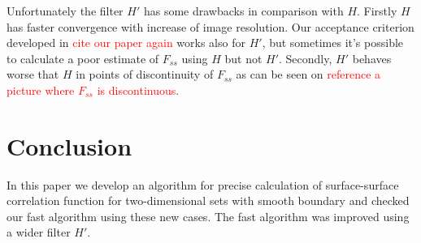 \documentclass[reprint,amsmath,amssymb,aps,pre,showkeys,showpacs]{revtex4-1}
\begin{document}
Unfortunately the filter $H'$ has some drawbacks in comparison with $H$. Firstly
$H$ has faster convergence with increase of image resolution. Our
acceptance criterion developed in \textcolor{red}{cite our paper again} works
also for $H'$, but sometimes it's possible to calculate a poor estimate of
$F_{ss}$ using $H$ but not $H'$. Secondly, $H'$ behaves worse that $H$ in points
of discontinuity of $F_{ss}$ as can be seen on \textcolor{red}{reference a
  picture where $F_{ss}$ is discontinuous}.

\section{Conclusion}
In this paper we develop an algorithm for precise calculation of surface-surface
correlation function for two-dimensional sets with smooth boundary and checked
our fast algorithm using these new cases. The fast algorithm was improved using
a wider filter $H'$.
\end{document}
